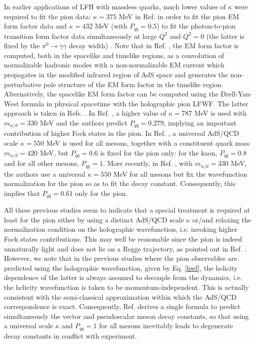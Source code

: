 \documentclass{PoS}
\begin{document}
In earlier applications of LFH with massless quarks, much lower values of $\kappa$ were required to fit the pion data: $\kappa=375$ MeV in Ref. \cite{Brodsky:2007hb} in order to fit the pion EM form factor data and $\kappa=432$ MeV (with $P_{q\bar{q}}=0.5$) to fit the photon-to-pion transition form factor data simultaneously at large $Q^2$ and $Q^2=0$ (the latter is fixed by the $\pi^0 \to \gamma \gamma$ decay width) \cite{Brodsky:2011xx}.  Note that in Ref. \cite{Brodsky:2007hb}, the EM form factor is computed, both in the spacelike and timelike regions, as a convolution of normalizable hadronic modes with a non-normalizable EM current which propagates in the modified infrared region of AdS space and generates the non-perturbative pole structure of the EM form factor in the timelike region. Alternatively, the spacelike EM form factor can be computed using the Drell-Yan-West formula \cite{Drell:1969km,West:1970av} in physical spacetime with the holographic pion LFWF. The latter approach is taken in Refs. \cite{Vega:2008te,Swarnkar:2015osa,Vega:2009zb,Branz:2010ub}. In  Ref. \cite{Vega:2009zb}, a higher value of $\kappa=787$ MeV is used with $m_{u/d}=330$ MeV and the authors predict $P_{q\bar{q}}=0.279$, implying an important contribution of higher Fock states in the pion. In Ref. \cite{Branz:2010ub}, a universal AdS/QCD scale $\kappa=550$ MeV is used for all mesons, together with a constituent quark mass $m_{u/d}=420$ MeV, but $P_{q\bar{q}}=0.6$ is fixed for the pion only: for the kaon, $P_{q\bar{q}}=0.8$ and for all other mesons, $P_{q\bar{q}}=1$. More recently, in Ref. \cite{Swarnkar:2015osa}, with $m_{u/d}=330$ MeV, the authors use a universal $\kappa=550$ MeV for all mesons but fix the wavefunction normalization for the pion so as to fit the decay constant. Consequently, this implies that $P_{q\bar{q}}=0.61$ only for the pion.

All these previous studies seem to indicate that a special treatment is required at least for the pion either by using a distinct AdS/QCD scale $\kappa$ or/and relaxing the normalization condition on the holographic wavefunction, i.e. invoking higher Fock states contributions. This may well be reasonable since the pion is indeed unnaturally light and does not lie on a Regge trajectory, as pointed out in Ref. \cite{Vega:2008te}. However, we note that in the previous studies \cite{Swarnkar:2015osa,Vega:2009zb,Branz:2010ub} where the pion observables are predicted using the holographic wavefunction, given by Eq. \eqref{hwf}, the helicity dependence of the latter is always assumed to decouple from the dynamics, i.e. the helicity wavefunction is taken to be momentum-independent. This is actually consistent with the semi-classical approximation within which the AdS/QCD correspondence is exact. Consequently, Ref. \cite{Branz:2010ub} derives a single formula to predict simultaneously the vector and pseudoscalar meson decay constants, so that using a universal scale $\kappa$ and $P_{q\bar{q}}=1$ for all mesons inevitably leads to degenerate decay constants in conflict with experiment.
\end{document}
